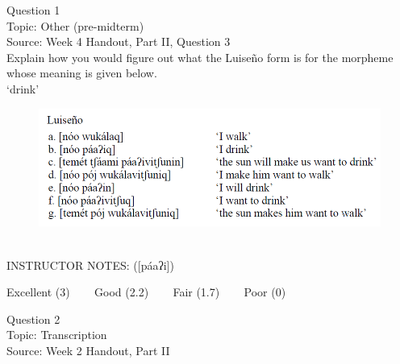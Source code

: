 \documentclass[12pt]{article}
\begin{document}
\begin{center}
\textbf{{\color{violet}{\HUGE 20210601 Tuesday\\}}}

\textbf{{\color{violet}{\HUGE ALL EXAMS (with notes)\\}}}

\end{center}
\newpage

\begin{center}
\textbf{{\color{blue}{\HUGE START OF EXAM\\}}}

\textbf{{\color{blue}{\HUGE Student ID: 15082\\}}}

\textbf{{\color{blue}{\HUGE 9:00\\}}}

\end{center}
\newpage

{\large Question 1}\\

Topic: Other (pre-midterm)\\
Source: Week 4 Handout, Part II, Question 3\\

Explain how you would figure out what the Luiseño form is for the morpheme whose meaning is given below.\\

‘drink’

\begin{figure}[H]
\includegraphics{../images/luiseno.png}
\end{figure}

~\\
INSTRUCTOR NOTES: ([páaʔi])


\vfill
Excellent (3) ~~~ Good (2.2) ~~~ Fair (1.7) ~~~ Poor (0)
\newpage

{\large Question 2}\\

Topic: Transcription\\
Source: Week 2 Handout, Part II\\
\end{document}
